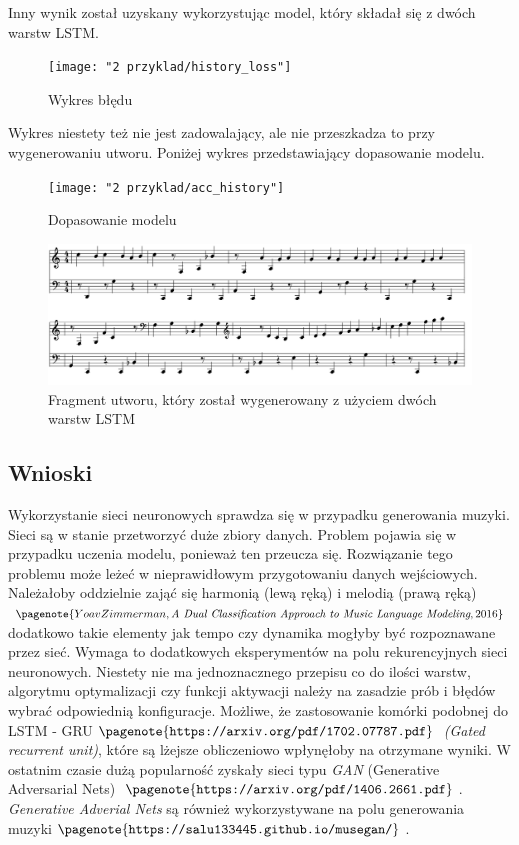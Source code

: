 	Inny wynik został uzyskany wykorzystując model, który składał się z dwóch warstw LSTM. 
	\begin{figure}[H]
		\centering
		\texttt{[image: "2 przyklad/history\_loss"]}
		\caption{Wykres błędu}
		\label{fig:historyloss}
	\end{figure}

	Wykres niestety też nie jest zadowalający, ale nie przeszkadza to przy wygenerowaniu utworu. Poniżej wykres przedstawiający dopasowanie modelu.
	\begin{figure}[H]
		\centering
		\texttt{[image: "2 przyklad/acc\_history"]}
		\caption{Dopasowanie modelu}
		\label{fig:acchistory}
	\end{figure}

	\begin{figure}[H]
		\centering
		\includegraphics[width=0.7\linewidth]{2przyklad}
		\caption{Fragment utworu, który został wygenerowany z użyciem dwóch warstw LSTM}
		\label{fig:2przyklad}
	\end{figure}	
	
	\subsection{Wnioski}	
	
	Wykorzystanie sieci neuronowych sprawdza się w przypadku generowania muzyki. Sieci są w stanie przetworzyć duże zbiory danych. Problem pojawia się w przypadku uczenia modelu, ponieważ ten przeucza się. Rozwiązanie tego problemu może leżeć w nieprawidłowym przygotowaniu danych wejściowych. Należałoby oddzielnie zająć się harmonią (lewą ręką) i melodią (prawą ręką)$\pagenote{Yoav Zimmerman, \textit{A Dual Classification Approach to Music Language Modeling}, 2016}$ dodatkowo takie elementy jak tempo czy dynamika mogłyby być rozpoznawane przez sieć. Wymaga to dodatkowych eksperymentów na polu rekurencyjnych sieci neuronowych. Niestety nie ma jednoznacznego przepisu co do ilości warstw, algorytmu optymalizacji czy funkcji aktywacji należy na zasadzie prób i błędów wybrać odpowiednią konfiguracje. Możliwe, że zastosowanie komórki podobnej do LSTM - GRU$\pagenote{\texttt{https://arxiv.org/pdf/1702.07787.pdf}}$ \textit{(Gated recurrent unit)}, które są lżejsze obliczeniowo wpłynęłoby na otrzymane wyniki. W ostatnim czasie dużą popularność zyskały sieci typu \textit{GAN} (Generative Adversarial Nets) $\pagenote{\texttt{https://arxiv.org/pdf/1406.2661.pdf}}$. \textit{Generative Adverial Nets }są również wykorzystywane na polu generowania muzyki$\pagenote{\texttt{https://salu133445.github.io/musegan/}}$.
		
